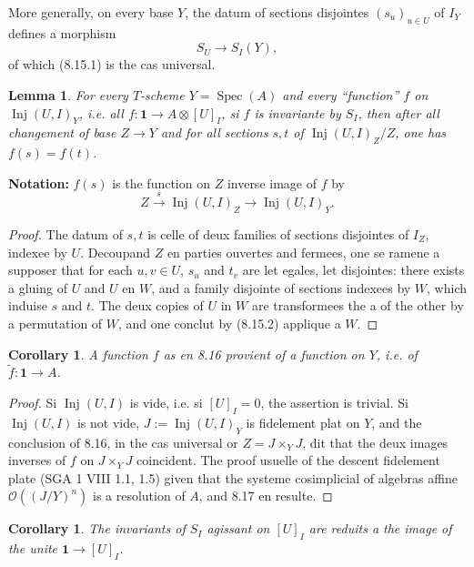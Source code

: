 \documentclass[11pt,a4paper]{article}
\theoremstyle{plain}
\newtheorem{lemma}[theorem]{Lemma}
\newtheorem{corollary}[theorem]{Corollary}
\theoremstyle{definition}
\DeclareMathOperator{\Spec}{Spec}
\DeclareMathOperator{\Inj}{Inj}
\begin{document}
More generally, on every base $Y$, the datum of sections disjointes $(s_u)_{u \in U}$ of $I_Y$ defines a morphism
\begin{equation}
S_U \to S_I(Y), \tag{8.15.2}
\end{equation}
of which (8.15.1) is the cas universal.

\begin{lemma}
For every $T$-scheme $Y = \Spec(A)$ and every ``function'' $f$ on $\Inj(U, I)_Y$, i.e. all $f : \mathbf{1} \to A \otimes [U]_I$, si $f$ is invariante by $S_I$, then after all changement of base $Z \to Y$ and for all sections $s, t$ of $\Inj(U, I)_Z/Z$, one has $f(s) = f(t)$.
\end{lemma}

\noindent\textbf{Notation:} $f(s)$ is the function on $Z$ inverse image of $f$ by
\[
Z \xrightarrow{s} \Inj(U, I)_Z \to \Inj(U, I)_Y.
\]

\begin{proof}
The datum of $s, t$ is celle of deux families of sections disjointes of $I_Z$, indexee by $U$. Decoupand $Z$ en parties ouvertes and fermees, one se ramene a supposer that for each $u, v \in U$, $s_u$ and $t_v$ are let egales, let disjointes: there exists a gluing of $U$ and $U$ en $W$, and a family disjointe of sections indexees by $W$, which induise $s$ and $t$. The deux copies of $U$ in $W$ are transformees the a of the other by a permutation of $W$, and one conclut by (8.15.2) applique a $W$.
\end{proof}

\begin{corollary}
A function $f$ as en 8.16 provient of a function on $Y$, i.e. of $\tilde{f} : \mathbf{1} \to A$.
\end{corollary}

\begin{proof}
Si $\Inj(U, I)$ is vide, i.e. si $[U]_I = 0$, the assertion is trivial. Si $\Inj(U, I)$ is not vide, $J := \Inj(U, I)_Y$ is fidelement plat on $Y$, and the conclusion of 8.16, in the cas universal or $Z = J \times_Y J$, dit that the deux images inverses of $f$ on $J \times_Y J$ coincident. The proof usuelle of the descent fidelement plate (SGA 1 VIII 1.1, 1.5) given that the systeme cosimplicial of algebras affine $\mathcal{O}((J/Y)^n)$ is a resolution of $A$, and 8.17 en resulte.
\end{proof}

\begin{corollary}
The invariants of $S_I$ agissant on $[U]_I$ are reduits a the image of the unite $\mathbf{1} \to [U]_I$.
\end{corollary}
\end{document}
